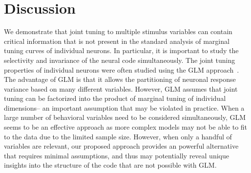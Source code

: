 \documentclass[11pt]{article}
\begin{document}
\section{Discussion}

We demonstrate that joint tuning to multiple stimulus variables can contain critical information that is not present in the standard analysis of marginal tuning curves of individual neurons. In particular, it is important to study the selectivity and invariance of the neural code simultaneously. 
The joint tuning properties of individual neurons were often studied using the GLM approach~\cite{Pillow2008spatio,Hardcastle2017multiplexed}. The advantage of GLM is that it allows the partitioning of neuronal response variance based on many different variables. However, GLM assumes that joint tuning can be factorized into the product of marginal tuning of individual dimensions-- an important assumption that may be violated in practice.
When a large number of behavioral variables need to be considered simultaneously, GLM seems to be an effective approach as more complex models may not be able to fit to the data due to the limited sample size. However, when only a handful of variables are relevant, our proposed approach provides an powerful alternative that requires minimal assumptions, and thus may potentially reveal unique insights into the structure of the code that are not possible with GLM. 
\end{document}
